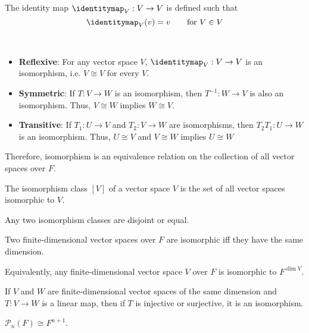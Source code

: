 \begin{definition}
  The identity map $\identitymap_V : V \to V$ is defined such that
  \[
    \identitymap_V(v) = v \qquad \text{for $V \in V$}
  \]
\end{definition}

\begin{theorem} \ \\
  \begin{itemize}
    \item \textbf{Reflexive}: For any vector space $V$, $\identitymap_V : V \to V$ is an isomorphism, i.e. $V \cong V$ for every $V$.
    \item \textbf{Symmetric}: If $T : V \to W$ is an isomorphism, then $T^{-1} : W \to V$ is also an isomorphism. Thus, $V \cong W$ implies $W \cong V$.
    \item \textbf{Transitive}: If $T_1 : U \to V$ and $T_2 : V \to W$ are isomorphisms, then $T_2 T_1 : U \to W$ is an isomorphism. Thus, $U \cong V$ and $V \cong W$ implies $U \cong W$
  \end{itemize}
  Therefore, isomorphism is an equivalence relation on the collection of all vector spaces over $F$.
\end{theorem}

\begin{definition}
  The isomorphism class $[V]$ of a vector space $V$ is the set of all vector spaces isomorphic to $V$.
\end{definition}

\begin{lemma}
  Any two isomorphism classes are disjoint or equal.
\end{lemma}

\begin{theorem}
  Two finite-dimensional vector spaces over $F$ are isomorphic iff they have the same dimension.

  Equivalently, any finite-dimensional vector space $V$ over $F$ is isomorphic to $F^{\dim V}$.
\end{theorem}

\begin{theorem}
  If $V$ and $W$ are finite-dimensional vector spaces of the same dimension and $T : V \to W$ is a linear map, then if $T$ is injective or surjective, it is an isomorphism.
\end{theorem}

\begin{lemma}
  $\mathcal{P}_n(F) \cong F^{n+1}$.
\end{lemma}

